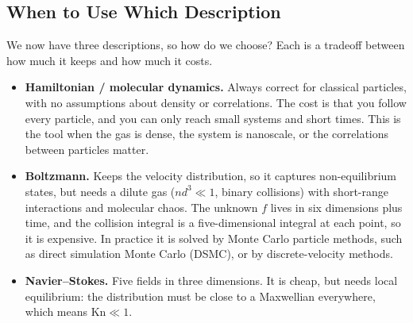 \subsection{When to Use Which Description}

We now have three descriptions, so how do we choose? Each is a tradeoff between how much it keeps and how much it costs.

\begin{itemize}
  \item \textbf{Hamiltonian / molecular dynamics.} Always correct for classical particles, with no assumptions about density or correlations. The cost is that you follow every particle, and you can only reach small systems and short times. This is the tool when the gas is dense, the system is nanoscale, or the correlations between particles matter.
  \item \textbf{Boltzmann.} Keeps the velocity distribution, so it captures non-equilibrium states, but needs a dilute gas ($nd^3\ll1$, binary collisions) with short-range interactions and molecular chaos. The unknown $f$ lives in six dimensions plus time, and the collision integral is a five-dimensional integral at each point, so it is expensive. In practice it is solved by Monte Carlo particle methods, such as direct simulation Monte Carlo (DSMC), or by discrete-velocity methods.
  \item \textbf{Navier--Stokes.} Five fields in three dimensions. It is cheap, but needs local equilibrium: the distribution must be close to a Maxwellian everywhere, which means $\mathrm{Kn}\ll1$.
\end{itemize}

